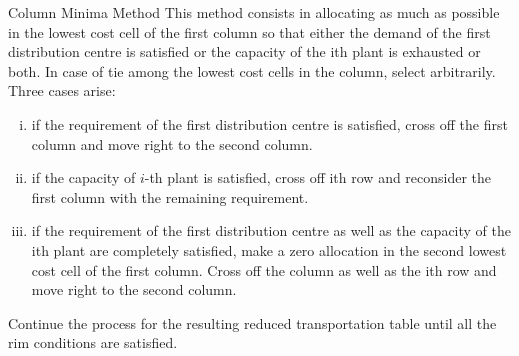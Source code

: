 \documentclass[../main.tex]{subfiles}
\begin{document}
\begin{frame}{Column Minima Method}
  This method consists in allocating as much as possible in the lowest cost cell of the first column so that either the demand of the first distribution centre is satisfied or the capacity of the ith plant is exhausted or both. In case of tie among the lowest cost cells in the column, select arbitrarily. Three cases arise:

  \begin{enumerate}[(i)] \justifying
\item if the requirement of the first distribution centre is satisfied, cross off the first column and move right to the second column. \item if the capacity of $i$-th plant is satisfied, cross off ith row and reconsider the first column with the remaining requirement. \item if the requirement of the first distribution centre as well as the capacity of the ith plant are completely satisfied, make a zero allocation in the second lowest cost cell of the first column. Cross off the column as well as the ith row and move right to the second column.
  \end{enumerate}
  
Continue the process for the resulting reduced transportation table until all the rim conditions are satisfied.
\end{frame}
\end{document}
